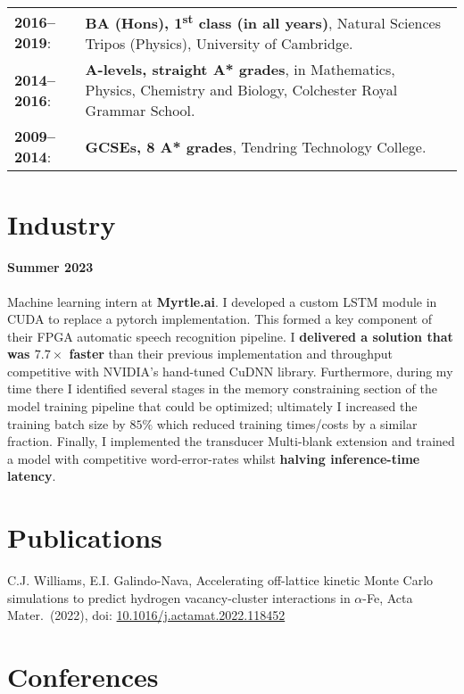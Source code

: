 \documentclass[11pt]{article}
\begin{document}
\begin{tabular}{@{}lp{}@{}}
    \textbf{2016--2019}:  & \textbf{BA (Hons), 1\textsuperscript{st} class (in all years)}, Natural Sciences Tripos (Physics), University of Cambridge. \\
    
    \textbf{2014--2016}:  & \textbf{A-levels, straight A* grades}, in Mathematics, Physics, Chemistry and Biology, Colchester Royal Grammar School.     \\
    
    \textbf{2009--2014}:  & \textbf{GCSEs, 8 A* grades}, Tendring Technology College.
    
\end{tabular}

\section*{Industry}

\paragraph*{Summer 2023} Machine learning intern at \textbf{Myrtle.ai}. I developed a custom LSTM module in CUDA to replace a pytorch implementation. This formed a key component of their FPGA automatic speech recognition pipeline. I \textbf{delivered a solution that was $7.7\times$ faster} than their previous implementation and throughput competitive with NVIDIA's hand-tuned CuDNN library. Furthermore, during my time there I identified several stages in the memory constraining section of the model training pipeline that could be optimized; ultimately I increased the training batch size by $85\%$ which reduced training times/costs by a similar fraction. Finally, I implemented the transducer Multi-blank extension and trained a model with competitive word-error-rates whilst \textbf{halving inference-time latency}. 

\section*{Publications}

C.J. Williams, E.I. Galindo-Nava, Accelerating off-lattice kinetic Monte Carlo
simulations to predict hydrogen vacancy-cluster interactions in $\alpha$-Fe, Acta Mater.\ (2022), doi:
\href{https://doi.org/10.1016/j.actamat.2022.118452}{10.1016/j.actamat.2022.118452}

\section*{Conferences}
\end{document}
